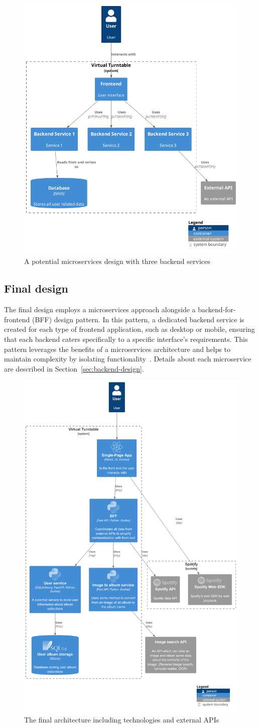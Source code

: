 \begin{figure} [H]
    \centering
    \includegraphics[width=0.5\linewidth]{figures/microservices_arch.png}
    \caption{A potential microservices design with three backend services}
    \label{fig:microservices-arch}
\end{figure}

\subsection{Final design}
The final design employs a microservices approach alongside a backend-for-frontend (BFF) design pattern. In this pattern, a dedicated backend service is created for each type of frontend application, such as desktop or mobile, ensuring that each backend caters specifically to a specific interface’s requirements. This pattern leverages the benefits of a microservices architecture and helps to maintain complexity by isolating functionality~\cite{BFF}. Details about each microservice are described in Section~\ref{sec:backend-design}.

\begin{figure} [H]
    \centering
    \includegraphics[width=0.5\linewidth]{figures/final_arch.png}
    \caption{The final architecture including technologies and external APIs}
    \label{fig:final-arch}
\end{figure}


